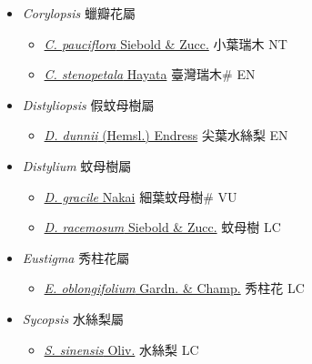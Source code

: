 
  \begin{itemize}
 \item[] \textit{Corylopsis} 蠟瓣花屬
                    
  \begin{itemize}
        \item[] \href{http://www.theplantlist.org/tpl1.1/search?q=Corylopsis+pauciflora}{\textit{C. pauciflora} Siebold \& Zucc.}   小葉瑞木 NT
        \item[] \href{http://www.theplantlist.org/tpl1.1/search?q=Corylopsis+stenopetala}{\textit{C. stenopetala} Hayata}   臺灣瑞木\# EN
  \end{itemize}
 \item[] \textit{Distyliopsis} 假蚊母樹屬
                    
  \begin{itemize}
        \item[] \href{http://www.theplantlist.org/tpl1.1/search?q=Distyliopsis+dunnii}{\textit{D. dunnii} (Hemsl.) Endress}   尖葉水絲梨 EN
  \end{itemize}
 \item[] \textit{Distylium} 蚊母樹屬
                    
  \begin{itemize}
        \item[] \href{http://www.theplantlist.org/tpl1.1/search?q=Distylium+gracile}{\textit{D. gracile} Nakai}   細葉蚊母樹\# VU
        \item[] \href{http://www.theplantlist.org/tpl1.1/search?q=Distylium+racemosum}{\textit{D. racemosum} Siebold \& Zucc.}   蚊母樹 LC
  \end{itemize}
 \item[] \textit{Eustigma} 秀柱花屬
                    
  \begin{itemize}
        \item[] \href{http://www.theplantlist.org/tpl1.1/search?q=Eustigma+oblongifolium}{\textit{E. oblongifolium} Gardn. \& Champ.}   秀柱花 LC
  \end{itemize}
 \item[] \textit{Sycopsis} 水絲梨屬
                    
  \begin{itemize}
        \item[] \href{http://www.theplantlist.org/tpl1.1/search?q=Sycopsis+sinensis}{\textit{S. sinensis} Oliv.}   水絲梨 LC
  \end{itemize}
  \end{itemize}
